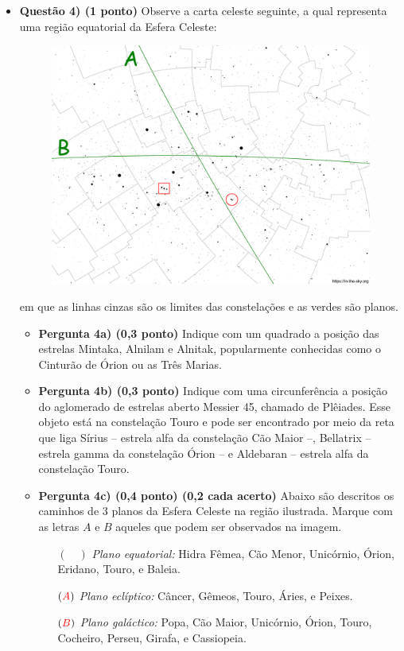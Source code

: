 \documentclass[a4paper, 12pt]{article}
\newcommand{\red}[1]{\textcolor{red}{#1}}
\begin{document}
\begin{flushleft}
\begin{itemize}
		\item \textbf{Questão 4) (1 ponto)} Observe a carta celeste seguinte, a qual representa uma região equatorial da Esfera Celeste:
			\begin{figure}[H]
				\centering
				\includegraphics[scale=0.5]{./img/4.png}
			\end{figure}
			em que as linhas cinzas são os limites das constelações e as verdes são planos.
			\begin{itemize}
				\item \textbf{Pergunta 4a) (0,3 ponto)} Indique com um quadrado a posição das estrelas Mintaka, Alnilam e Alnitak, popularmente conhecidas como o Cinturão de Órion ou as Três Marias.
				\item \textbf{Pergunta 4b) (0,3 ponto)} Indique com uma circunferência a posição do aglomerado de estrelas aberto Messier 45, chamado de Plêiades. Esse objeto está na constelação Touro e pode ser encontrado por meio da reta que liga Sírius -- estrela alfa da constelação Cão Maior --, Bellatrix -- estrela gamma da constelação Órion -- e Aldebaran -- estrela alfa da constelação Touro.
				\item \textbf{Pergunta 4c) (0,4 ponto) (0,2 cada acerto)} Abaixo são descritos os caminhos de 3 planos da Esfera Celeste na região ilustrada. Marque com as letras $A$ e $B$ aqueles que podem ser observados na imagem.
					\begin{itemize}
						\item[$(\quad)$] \textit{Plano equatorial:} Hidra Fêmea, Cão Menor, Unicórnio, Órion, Eridano, Touro, e Baleia.
						\item[$(\red{A})$] \textit{Plano eclíptico:} Câncer, Gêmeos, Touro, Áries, e Peixes.
						\item[$(\red{B})$] \textit{Plano galáctico:} Popa, Cão Maior, Unicórnio, Órion, Touro, Cocheiro, Perseu, Girafa, e Cassiopeia.
					\end{itemize}
			\end{itemize} 
				

\end{itemize}
\end{flushleft}
\end{document}
